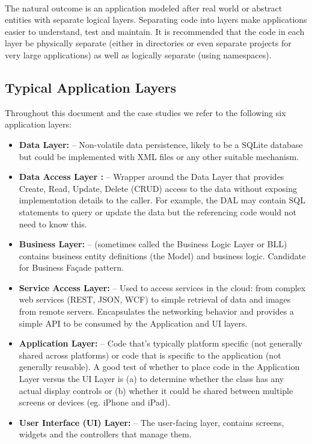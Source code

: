\paragraph{}
The natural outcome is an application modeled after real world or abstract entities with separate logical layers. Separating code into layers make applications easier to understand, test and maintain. It is recommended that the code in each layer be physically separate (either in directories or even separate projects for very large applications) as well as logically separate (using namespaces).

\subsection{Typical Application Layers}


Throughout this document and the case studies we refer to the following six application layers:

\begin{itemize}
\item \textbf{Data Layer:}  – Non-volatile data persistence, likely to be a SQLite database but could be implemented with XML files or any other suitable mechanism.
\item \textbf{ Data Access Layer :} – Wrapper around the Data Layer that provides Create, Read, Update, Delete (CRUD) access to the data without exposing implementation details to the caller. For example, the DAL may contain SQL statements to query or update the data but the referencing code would not need to know this.
\item \textbf{ Business Layer:}  – (sometimes called the Business Logic Layer or BLL) contains business entity definitions (the Model) and business logic. Candidate for Business Façade pattern.
\item \textbf{Service Access Layer:}  – Used to access services in the cloud: from complex web services (REST, JSON, WCF) to simple retrieval of data and images from remote servers. Encapsulates the networking behavior and provides a simple API to be consumed by the Application and UI layers.
\item \textbf{ Application Layer:}  – Code that’s typically platform specific (not generally shared across platforms) or code that is specific to the application (not generally reusable). A good test of whether to place code in the Application Layer versus the UI Layer is (a) to determine whether the class has any actual display controls or (b) whether it could be shared between multiple screens or devices (eg. iPhone and iPad).
\item \textbf{ User Interface (UI) Layer:}  – The user-facing layer, contains screens, widgets and the controllers that manage them.

\end{itemize}

